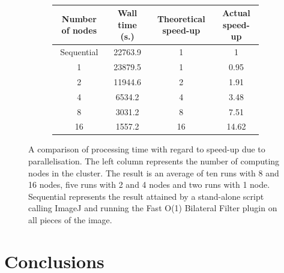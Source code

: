 \documentclass [12pt,a4paper]{report}
\begin{document}
\begin{figure}[h]
%
\\
\begin{subfigure}{.5\textwidth}
\begin{center}
	\begin{tabular}{c | c | c | c}
	Number of nodes & Wall time (s.) & Theoretical speed-up & Actual speed-up \\ 
	\hline
	Sequential & 22763.9 & 1 & 1 \\
	1 & 23879.5 & 1 & 0.95 \\
	2 & 11944.6 & 2 & 1.91 \\
	4 & 6534.2 & 4 & 3.48 \\
	8 & 3031.2 & 8 & 7.51 \\
	16 & 1557.2 & 16 & 14.62 \\
	\end{tabular}
\end{center}
\end{subfigure}
\caption[A comparison of processing time with regard to speed-up]{A comparison of processing time with regard to speed-up due to parallelisation. The left column represents the number of computing nodes in the cluster. The result is an average of ten runs with 8 and 16 nodes, five runs with 2 and 4 nodes and two runs with 1 node. Sequential represents the result attained by a stand-alone script calling ImageJ and running the Fast O(1) Bilateral Filter plugin on all pieces of the image.}
\label{bf_speedup}
\end{figure}



\chapter{Conclusions}
\end{document}
